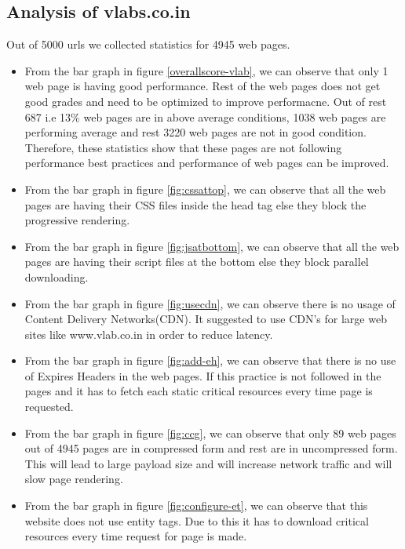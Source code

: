\documentclass[conference]{IEEEtran}
\begin{document}
\subsection{Analysis of vlabs.co.in}
 Out of 5000 urls we collected statistics for 4945 web pages.
\begin{itemize}
\item From the bar graph in figure \ref{overallscore-vlab}, we can observe that only 1 web page is having good
performance. Rest of the web pages does not get good grades and need to be
optimized to improve performacne. Out of rest 687 i.e 13\% web pages are in above average conditions, 1038
web pages are performing average and rest 3220 web pages are not in good
condition. Therefore, these statistics show that these pages are not following
performance best practices and performance of web pages can be improved.  
 
\item From the bar graph in figure \ref{fig:cssattop}, we can observe that all the web pages are having their
CSS files inside the head tag else they block the progressive rendering.

\item From the bar graph in figure \ref{fig:jsatbottom}, we can observe that all the web pages are having their
script files at the bottom else they block parallel downloading.

\item From the bar graph in figure \ref{fig:usecdn}, we can observe there is no usage of Content Delivery
Networks(CDN). It suggested to use CDN's for large web sites like www.vlab.co.in in order to reduce latency.

\item From the bar graph in figure \ref{fig:add-eh}, we can observe that there is no use of Expires
Headers in the web pages. If this practice is not followed in the pages and it has to
fetch each static critical resources every time page is requested.

\item From the bar graph in figure \ref{fig:ccg}, we can observe that only 89 web pages out of 4945
pages are in compressed form and rest are in uncompressed form. This will lead to
large payload size and will increase network traffic and will slow page
rendering.

\item From the bar graph in figure \ref{fig:configure-et}, we can observe that this website does not use entity
tags. Due to this it has to download critical resources every time request for page is made.


\end{itemize}
\end{document}

